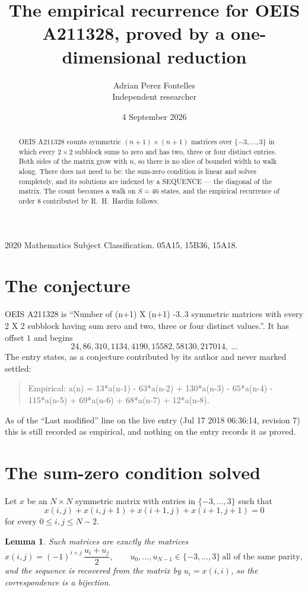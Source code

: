 \documentclass[11pt,a4paper]{article}
\title{The empirical recurrence for OEIS A211328, proved by a one-dimensional reduction}
\author{Adrian Perez Fontelles\\ \small Independent researcher}
\date{4 September 2026}
\theoremstyle{plain}
\newtheorem{lemma}[theorem]{Lemma}
\theoremstyle{definition}
\begin{document}
\maketitle

\begin{abstract}
OEIS A211328 counts symmetric $(n+1)\times(n+1)$ matrices over
$\{-3,\dots,3\}$ in which every $2\times2$ subblock sums to zero and has two, three or four distinct
entries. Both sides of the matrix grow with $n$, so there is no slice of bounded width to walk
along. There does not need to be: the sum-zero condition is linear and solves completely, and
its solutions are indexed by a SEQUENCE --- the diagonal of the matrix. The count becomes a walk
on $S=46$ states, and the empirical recurrence of order $8$ contributed by R.~H.~Hardin
follows.
\end{abstract}

\noindent\small 2020 Mathematics Subject Classification. 05A15, 15B36, 15A18.\normalsize

\section{The conjecture}

OEIS A211328 is ``Number of (n+1) X (n+1) -3..3 symmetric matrices with every 2 X 2 subblock having sum zero and two, three or four distinct values.''. It has offset $1$ and begins
\[
24, 86, 310, 1134, 4190, 15582, 58130, 217014,\ \dots
\]
The entry states, as a conjecture contributed by its author and never marked settled:
\begin{quote}
Empirical: a(n) = 13*a(n-1) - 63*a(n-2) + 130*a(n-3) - 65*a(n-4) - 115*a(n-5) + 69*a(n-6) + 68*a(n-7) + 12*a(n-8).
\end{quote}
As of the ``Last modified'' line on the live entry (Jul 17 2018 06:36:14, revision 7) this is still
recorded as empirical, and nothing on the entry records it as proved.

\section{The sum-zero condition solved}

Let $x$ be an $N\times N$ symmetric matrix with entries in $\{-3,\dots,3\}$ such that
\[
x(i,j)+x(i,j{+}1)+x(i{+}1,j)+x(i{+}1,j{+}1)=0
\]
for every $0\le i,j\le N-2$.

\begin{lemma}\label{lem:solve}
Such matrices are exactly the matrices
\[
x(i,j)=(-1)^{i+j}\,\frac{u_i+u_j}{2},
\qquad u_0,\dots,u_{N-1}\in\{-3,\dots,3\}\ \text{all of the same parity},
\]
and the sequence is recovered from the matrix by $u_i=x(i,i)$, so the correspondence is a
bijection.
\end{lemma}
\end{document}

